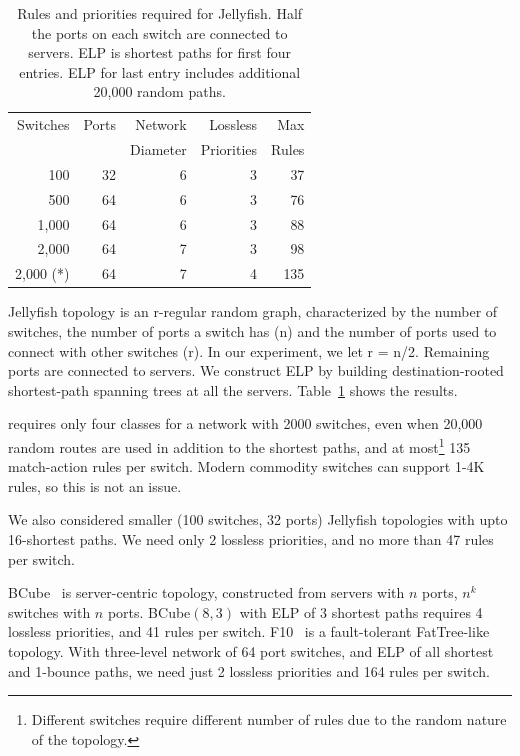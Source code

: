 \begin{table}[t]
		\footnotesize
	\centering
		\begin{tabular}{|r|r|r|r|r|}
			\hline
				Switches & Ports & Network & Lossless & Max \\
						 &		 & Diameter & Priorities & Rules \\
			\hline
			\hline
			100 & 32 & 6 & 3 &  37 \\
			\hline
			500 & 64 & 6 & 3 & 76 \\
			\hline
			1,000 & 64 & 6 & 3 & 88 \\
			\hline
			2,000 & 64 & 7 & 3 & 98 \\
			\hline
			2,000 (*)  & 64 & 7 & 4 &  135\\
			\hline
			
		\end{tabular}
		\caption{Rules and priorities required for Jellyfish. Half the ports on
		each switch are connected to servers. ELP is shortest paths for first four entries. ELP for last entry includes additional 20,000 random paths.}
\label{table:jellyfish_shortestpath} \end{table}

Jellyfish topology is an r-regular random graph, characterized by the number of
switches, the number of ports a switch has (n) and the number of ports used to
connect with other switches (r).  In our experiment, we let r = n/2. Remaining
ports are connected to servers. We construct ELP by building destination-rooted
shortest-path spanning trees at all the servers.
Table~\ref{table:jellyfish_shortestpath} shows the results.

\sysname{} requires only four classes for a network with 2000 switches, even
when 20,000 random routes are used in addition to the shortest paths, and at
most\footnote{Different switches require different number of rules due to the
random nature of the topology.} 135 match-action rules per switch.  Modern
commodity switches can support 1-4K rules, so this is not an issue.

We also considered smaller (100 switches, 32 ports) Jellyfish
topologies with upto 16-shortest paths. We need only 2 lossless
priorities, and no more than 47 rules per switch.

BCube~\cite{bcube} is server-centric topology, constructed from servers with $n$
ports, $n^k$ switches with $n$ ports. BCube$(8,3)$ with ELP of $3$ shortest
paths requires 4 lossless priorities, and 41 rules per switch.
F10~\cite{f10} is a fault-tolerant FatTree-like topology.  With three-level
network of 64 port switches, and ELP of all shortest and 1-bounce paths, we need
just 2 lossless priorities and 164 rules per switch.

